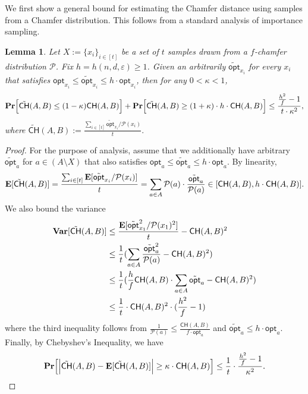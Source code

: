 \documentclass[11pt]{article}
\newcommand{\eps}{\varepsilon}
\theoremstyle{plain}
\newtheorem{lem}[theorem]{Lemma}
\newcommand{\calP}{\mathcal{P}} \newcommand{\calD}{\mathcal{D}}
\newcommand{\bpr}[1]{\text{\bf Pr}\normalfont\Bigl[ #1 \Bigr]}
\newcommand{\var}[1]{\text{\bf Var}\normalfont\lbrack #1 \rbrack}
\newcommand{\e}[1]{\text{\bf E}\normalfont\lbrack #1 \rbrack}
\newcommand{\opt}{\mathsf{opt}}
\begin{document}
We first show a general bound for estimating the Chamfer distance using samples from a Chamfer distribution. This follows from a standard analysis of importance sampling. 
\begin{lem}\label{Lemma:general}
    Let $X := \{x_i\}_{i \in [t]}$ be a set of $t$ samples drawn from a $f$-chamfer distribution $\calP$. Fix $h = h(n, d, \eps) \geq 1$. Given an arbitrarily $\tilde{\opt}_{x_i}$ for every $x_i$ that satisfies $\opt_{x_i} \leq \tilde{\opt}_{x_i} \leq h\cdot \opt_{x_i}$, then for any $0 < \kappa < 1$,
    \[\bpr{\tilde{\mathsf{CH}}(A, B) \leq (1-\kappa) \mathsf{CH}(A, B) } +  \bpr{\tilde{\mathsf{CH}}(A, B) \geq (1+\kappa) \cdot h \cdot \mathsf{CH}(A, B)} \leq \frac{\frac{h^2}{f}-1}{t \cdot \kappa^2}, \] where
    $\tilde{\mathsf{CH}}(A, B) := \frac{\sum_{i \in [t]}\tilde{\opt}_{x_i} / \calP(x_i) }{t }.$
\end{lem}

\begin{proof}
For the purpose of analysis, assume that we additionally have arbitrary $\tilde{\opt}_{a}$ for $a \in (A \setminus X)$ that also satisfies $\opt_{a} \leq \tilde{\opt}_{a} \leq h\cdot \opt_{a}$. 
    By linearity,
    \[\e{\tilde{\mathsf{CH}}(A, B)} = \frac{\sum_{i \in [t]}\e{ \tilde{\opt}_{x_i} / \calP(x_i) }}{t}
        =  \sum_{a \in A} \calP(a) \cdot \frac{\tilde{\opt}_{a}}{\calP(a) }
        \in [\mathsf{CH}(A, B), h\cdot \mathsf{CH}(A, B)].\]
    We also bound the variance
    \begin{align*}
        \var{\tilde{\mathsf{CH}}(A, B)} &\leq \frac{\e{\tilde{\opt}_{x_1}^2 / \calP(x_1)^2}}{t} - \mathsf{CH}(A, B)^2\\
        &\leq \frac{1}{t} (\sum_{a \in A}  \frac{\tilde{\opt}_{a}^2}{\calP(a)} - \mathsf{CH}(A, B)^2) \\
        &\leq \frac{1}{t}(\frac{h}{f}\mathsf{CH}(A, B)\cdot \sum_{a \in A}  \tilde{\opt}_{a} - \mathsf{CH}(A, B)^2) \\
        &\leq \frac{1}{t}\cdot \mathsf{CH}(A, B)^2 \cdot (\frac{h^2}{f}- 1) 
    \end{align*}
    where the third inequality follows from $\frac{1}{\calP(a)} \leq \frac{\mathsf{CH}(A, B)}{f\cdot  \opt_a}$ and $\tilde{\opt}_a \leq  h \cdot \opt_a$. Finally, by Chebyshev's Inequality, we have
    \[\bpr{\Bigl| \tilde{\mathsf{CH}}(A, B) - \e{\tilde{\mathsf{CH}}(A, B)} \Bigr| \geq \kappa \cdot \mathsf{CH}(A, B)} \leq \frac{1}{t} \cdot \frac{\frac{h^2}{f}-1}{\kappa^2 }.\]
\end{proof}
\end{document}

